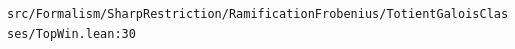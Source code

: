 \nolinkurl{src/Formalism/SharpRestriction/RamificationFrobenius/TotientGaloisClasses/TopWin.lean:30}%
